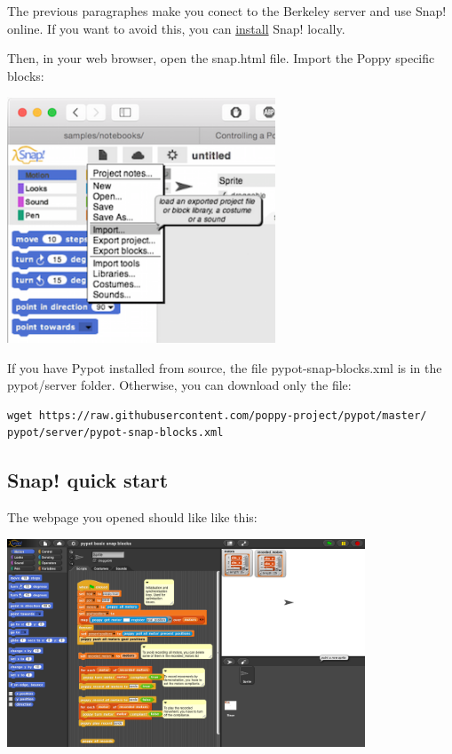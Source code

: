 \documentclass{article}
\begin{document}
The previous paragraphes make you conect to the Berkeley server and use Snap! online. If you want to avoid this, you can \href{https://github.com/jmoenig/Snap--Build-Your-Own-Blocks}{install} Snap! locally.

Then, in your web browser, open the snap.html file. Import the Poppy specific blocks:

 \begin{center}
  \includegraphics[width=0.6\textwidth]{img/snap-import}
 \end{center}

If you have Pypot installed from source, the file pypot-snap-blocks.xml is in the pypot/server folder. Otherwise, you can download only the file:
\begin{verbatim}
wget https://raw.githubusercontent.com/poppy-project/pypot/master/
pypot/server/pypot-snap-blocks.xml
\end{verbatim}

\subsection{Snap! quick start}

The webpage you opened should like like this:

 \begin{center}
  \includegraphics[width=0.8\textwidth]{img/snap_full}
 \end{center}
\end{document}
